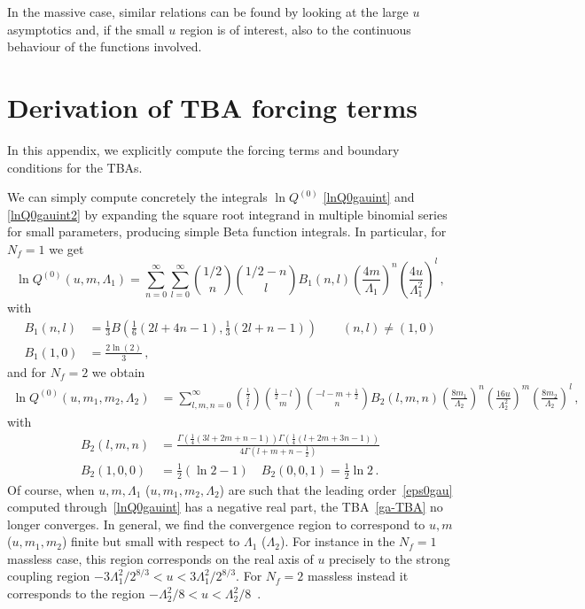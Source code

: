 \documentclass[11pt,a4paper]{elsarticle}
\def \ba {\begin{aligned}}
\def \ea {\end{aligned}}
\newcommand{\be}{\begin{equation}}
\newcommand{\ee}{\end{equation}}
\numberwithin{figure}{section}
\numberwithin{table}{section}
\begin{document}
In the massive case, similar relations can be found by looking at the large $u$ asymptotics and, if the small $u$ region is of interest, also to the continuous behaviour of the functions involved.

\section{Derivation of TBA forcing terms} \label{appForcing}

In this appendix, we explicitly compute the forcing terms and boundary conditions for the TBAs.

We can simply compute concretely the integrals $\ln Q^{(0)}$ \eqref{lnQ0gauint} and \eqref{lnQ0gauint2} by expanding the square root integrand in multiple binomial series for small parameters, producing simple Beta function integrals. In particular, for $N_f=1$ we get
\be \label{lnQ0gau}
\ln Q^{(0)}(u,m,\Lambda_1)=\sum_{n=0}^{\infty}\sum_{l=0}^{\infty}\binom{1/2}{n}\binom{1/2-n}{l}B_1(n,l)\left(\frac{4m}{\Lambda_1}\right)^{n}\left(\frac{4 u}{\Lambda_1^2}\right)^{l}\,,
\ee
with
\be
\ba
B_1(n,l)&=\frac{1}{3}B \left(\frac{1}{6} (2 l+4 n-1),\frac{1}{3} (2 l+n-1)\right) \qquad (n,l)\neq(1,0) \\
B_1(1,0)&=\frac{2 \ln (2)}{3}\,,
\ea
\ee
and for $N_f=2$ we obtain
\be
\ba 
\ln Q^{(0)}(u,m_1,m_2,\Lambda_2)&= \sum_{l,m,n=0}^\infty \binom{\frac{1}{2}}{l} \binom{\frac{1}{2}-l}{m} \binom{-l-m+\frac{1}{2}}{n} B_2(l,m,n) \left(\frac{8 m_1}{\Lambda_2}\right)^n \left(\frac{16 u}{\Lambda_2^2}\right)^m \left(\frac{8 m_2}{\Lambda_2}\right)^l \,,
\ea
\ee
with
\be 
\ba
B_2(l,m,n)&=\frac{\Gamma \left(\frac{1}{4} (3 l+2 m+n-1)\right) \Gamma \left(\frac{1}{4} (l+2 m+3 n-1)\right)}{4 \Gamma \left(l+m+n-\frac{1}{2}\right)} \\
B_2(1,0,0)&=\frac{1}{2} (\ln 2-1)  \quad  B_2(0,0,1)= \frac{1}{2}\ln 2\,.
\ea 
\ee
Of course, when $u,m,\Lambda_1$ ($u,m_1,m_2,\Lambda_2$) are such that the leading order~\eqref{eps0gau} computed through~\eqref{lnQ0gauint} has a negative real part, the TBA~\eqref{ga-TBA} no longer converges. In general, we find the convergence region to correspond to $u,m$ ($u,m_1,m_2$) finite but small with respect to $\Lambda_1$ ($\Lambda_2$). For instance in the $N_f=1$ massless case, this region corresponds on the real axis of $u$ precisely to the strong coupling region $-3\Lambda_1^2/2^{8/3}<u<3\Lambda_1^2/2^{8/3}$. For $N_f=2$ massless instead it corresponds to the region $-\Lambda_2^2/8<u<\Lambda_2^2/8$~\cite{BilalFerrariQCD:1996}.
\end{document}
